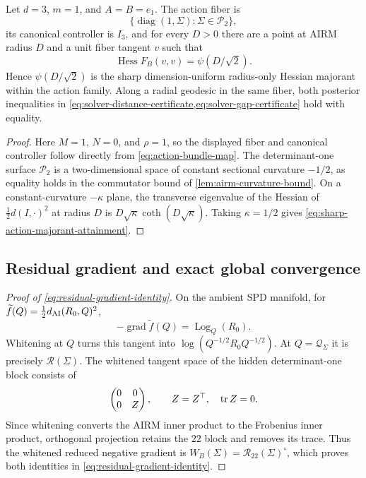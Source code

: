 \begin{proposition}
\label{prop:sharp-action-majorant}
Let \(d=3\), \(m=1\), and \(A=B=e_1\).  The action fiber is
\[
  \{\operatorname{diag}(1,\Sigma):\Sigma\in\mathscr P_2\},
\]
its canonical controller is \(I_3\), and for every \(D>0\) there are a point
at AIRM radius \(D\) and a unit fiber tangent \(v\) such that
\begin{equation}
  \operatorname{Hess}F_B(v,v)=\psi(D/\sqrt2).
  \label{eq:sharp-action-majorant-attainment}
\end{equation}
Hence \(\psi(D/\sqrt2)\) is the sharp dimension-uniform radius-only Hessian
majorant within the action family.  Along a radial geodesic in the same fiber,
both posterior inequalities in
\cref{eq:solver-distance-certificate,eq:solver-gap-certificate} hold with
equality.
\end{proposition}

\begin{proof}
Here \(M=1\), \(N=0\), and \(\rho=1\), so the displayed fiber and canonical
controller follow directly from \cref{eq:action-bundle-map}.  The
determinant-one surface \(\mathscr P_2\) is a two-dimensional space of
constant sectional curvature \(-1/2\), as equality holds in the commutator
bound of \cref{lem:airm-curvature-bound}.  On a constant-curvature
\(-\kappa\) plane, the transverse eigenvalue of the Hessian of
\(\tfrac12d(I,\cdot)^2\) at radius \(D\) is
\(D\sqrt\kappa\coth(D\sqrt\kappa)\).  Taking \(\kappa=1/2\) gives
\eqref{eq:sharp-action-majorant-attainment}.
\end{proof}

\subsection{Residual gradient and exact global convergence}

\begin{proof}[Proof of \cref{eq:residual-gradient-identity}]
On the ambient SPD manifold, for
\(\widetilde f(Q)=\tfrac12d_{\mathrm{AI}}(R_0,Q)^2\),
\[
  -\operatorname{grad}\widetilde f(Q)=\operatorname{Log}_Q(R_0).
\]
Whitening at \(Q\) turns this tangent into
\(\log(Q^{-1/2}R_0Q^{-1/2})\).  At
\(Q=\mathcal Q_\Sigma\) it is precisely \(\mathcal R(\Sigma)\).
The whitened tangent space of the hidden determinant-one block consists of
\[
  \begin{pmatrix}0&0\\0&Z\end{pmatrix},
  \qquad Z=Z^\top,\quad\operatorname{tr} Z=0.
\]
Since whitening converts the AIRM inner product to the Frobenius inner
product, orthogonal projection retains the \(22\) block and removes its
trace.  Thus the whitened reduced negative gradient is
\(W_B(\Sigma)=\mathcal R_{22}(\Sigma)^\circ\), which proves both identities
in \cref{eq:residual-gradient-identity}.
\end{proof}

